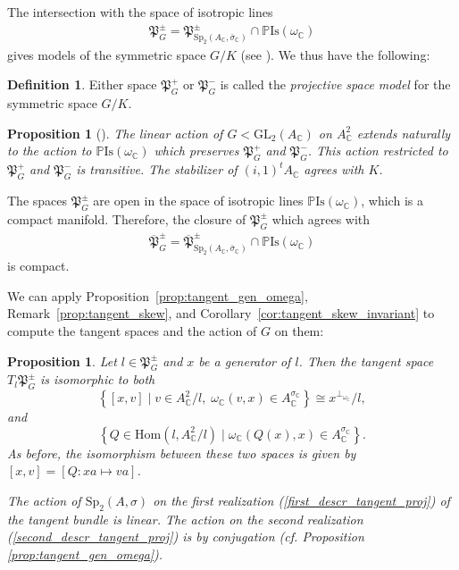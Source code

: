 \documentclass[oneside,11pt]{amsart}
\newtheorem{prop}[thm]{Proposition}
\theoremstyle{definition}
\newtheorem{defn}[thm]{Definition}
\theoremstyle{remark}
\numberwithin{thm}{section}
\numberwithin{equation}{section}
\begin{document}
The intersection with the space of isotropic lines
\begin{align*}
   \mathfrak{P}_G^\pm=\mathfrak{P}^\pm_{\mathrm{Sp}_{2}(A_\mathbb C,\bar\sigma_\mathbb C)}\cap \mathbb{P}\mathrm{Is}\left( {{\omega}_{\mathbb{C}}} \right)
\end{align*}
gives models of the symmetric space $G/K$ (see \cite[Corollary 5.21]{ABRRW}). We thus have the following:

\begin{defn}
    Either space $\mathfrak{P}^+_G$ or $\mathfrak{P}^-_G$ is called the \emph{projective space model}  for the symmetric space $G/K$.
\end{defn}

\begin{prop}[{\cite[Proposition~5.18]{ABRRW}}]
    The linear action of $G<\mathrm{GL}_2(A_\mathbb C)$ on $A_\mathbb C^2$ extends naturally to the action to $\mathbb{P}\mathrm{Is}(\omega_\mathbb{C})$ which preserves $\mathfrak{P}_G^+$ and $\mathfrak{P}_G^-$. This action restricted to $\mathfrak{P}_G^+$ and $\mathfrak{P}_G^-$ is transitive. The stabilizer of $(i,1)^tA_\mathbb C$ agrees with $K$.
\end{prop}

The spaces $\mathfrak{P}_G^\pm$ are open in the space of isotropic lines $\mathbb{P}\mathrm{Is}\left( {{\omega }_{\mathbb{C}}}\right)$, which is a compact manifold. Therefore, the closure of $\mathfrak{P}_G^\pm$ which agrees with 
\begin{align*}
   \overline {\mathfrak{P}}_G^\pm=\overline{\mathfrak{P}}^\pm_{\mathrm{Sp}_{2}(A_\mathbb C,\bar\sigma_\mathbb C)}\cap \mathbb{P}\mathrm{Is}\left( {{\omega}_{\mathbb{C}}} \right)
\end{align*}
 is compact.

We can apply Proposition~\ref{prop:tangent_gen_omega}, Remark~\ref{prop:tangent_skew},  and Corollary~\ref{cor:tangent_skew_invariant} to compute the tangent spaces and the action of $G$ on them:

\begin{prop}\label{prop:tangent_pm}
    Let $l\in \mathfrak{P}_G^\pm$ and $x$ be a generator of $l$. Then the tangent space $T_l\mathfrak{P}_G^\pm$ is isomorphic to both
    \begin{equation}\label{first_descr_tangent_proj}
    {\left\{ [x,v]\mid v\in A^{2}_{\mathbb C}/l,\; \omega_\mathbb C(v,x)\in A_\mathbb C^{{\sigma_{\mathbb C}}} \right\}}\cong x^{\perp_{\omega_\mathbb C}}/l,
    \end{equation}
    and
    \begin{equation}\label{second_descr_tangent_proj}
    \left\{Q\in\mathrm{Hom}(l,A_\mathbb C^2/l)\mid \omega_\mathbb C(Q(x),x)\in A^{\sigma_\mathbb C}_\mathbb C\right\}.
    \end{equation}
    As before, the isomorphism between these two spaces is given by $[x,v]=[Q\colon xa\mapsto va]$.

\noindent The action of $\mathrm{Sp}_2(A,\sigma)$ on the first realization (\ref{first_descr_tangent_proj}) of the tangent bundle is linear. The action on the second realization (\ref{second_descr_tangent_proj}) is by conjugation (cf. Proposition \ref{prop:tangent_gen_omega}).
\end{prop}
\end{document}
